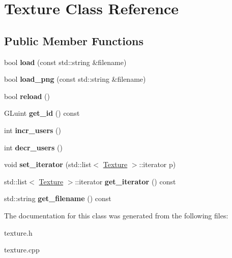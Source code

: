 \hypertarget{class_texture}{
\section{Texture Class Reference}
\label{class_texture}
}
\subsection*{Public Member Functions}
\begin{DoxyCompactItemize}
\item 
\hypertarget{class_texture_afe15448776b7a3040b5ac554f5268882}{
bool {\bfseries load} (const std::string \&filename)}
\label{class_texture_afe15448776b7a3040b5ac554f5268882}

\item 
\hypertarget{class_texture_a5da0b637f4f60023bdb34c7fc0bfac30}{
bool {\bfseries load\_\-png} (const std::string \&filename)}
\label{class_texture_a5da0b637f4f60023bdb34c7fc0bfac30}

\item 
\hypertarget{class_texture_a58f36b4564a9f88618a361428872bad5}{
bool {\bfseries reload} ()}
\label{class_texture_a58f36b4564a9f88618a361428872bad5}

\item 
\hypertarget{class_texture_a0add1c10514983c744bcdbd4a590a2bc}{
GLuint {\bfseries get\_\-id} () const }
\label{class_texture_a0add1c10514983c744bcdbd4a590a2bc}

\item 
\hypertarget{class_texture_a7df5a9a05483399fc98a037d97cfaf41}{
int {\bfseries incr\_\-users} ()}
\label{class_texture_a7df5a9a05483399fc98a037d97cfaf41}

\item 
\hypertarget{class_texture_a324826a254e44e9a26becd9e790132f5}{
int {\bfseries decr\_\-users} ()}
\label{class_texture_a324826a254e44e9a26becd9e790132f5}

\item 
\hypertarget{class_texture_a627c6db64a9e00290bae3ba01ec5010a}{
void {\bfseries set\_\-iterator} (std::list$<$ \hyperlink{class_texture}{Texture} $>$::iterator p)}
\label{class_texture_a627c6db64a9e00290bae3ba01ec5010a}

\item 
\hypertarget{class_texture_abdfd3980e8687eb256485f02cfbd612e}{
std::list$<$ \hyperlink{class_texture}{Texture} $>$::iterator {\bfseries get\_\-iterator} () const }
\label{class_texture_abdfd3980e8687eb256485f02cfbd612e}

\item 
\hypertarget{class_texture_a2dc33fe6412ba9214a995e28895af446}{
std::string {\bfseries get\_\-filename} () const }
\label{class_texture_a2dc33fe6412ba9214a995e28895af446}

\end{DoxyCompactItemize}


The documentation for this class was generated from the following files:\begin{DoxyCompactItemize}
\item 
texture.h\item 
texture.cpp\end{DoxyCompactItemize}
